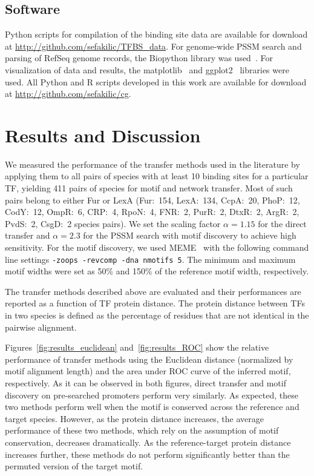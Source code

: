 \documentclass[]{llncs}
\begin{document}
\subsection{Software}
Python scripts for compilation of the binding site data are available for
download at \url{http://github.com/sefakilic/TFBS_data}. For genome-wide PSSM
search and parsing of RefSeq genome records, the Biopython library was
used~\cite{cock2009biopython}. For visualization of data and results, the
matplotlib~\cite{Hunter2007} and ggplot2~\cite{Wickham2009} libraries were
used. All Python and R scripts developed in this work are available for download
at \url{http://github.com/sefakilic/cg}.

\section{Results and Discussion}
We measured the performance of the transfer methods used in the literature by
applying them to all pairs of species with at least 10 binding sites for a
particular TF, yielding 411 pairs of species for motif and network
transfer. Most of such pairs belong to either Fur or LexA (Fur:~154, LexA:~134,
CcpA:~20, PhoP:~12, CodY:~12, OmpR:~6, CRP:~4, RpoN:~4, FNR:~2, PurR:~2,
DtxR:~2, ArgR:~2, PvdS:~2, CsgD:~2 species pairs). We set the scaling factor
$\alpha=1.15$ for the direct transfer and $\alpha=2.3$ for the PSSM search with
motif discovery to achieve high sensitivity. For the motif discovery, we used
MEME~\cite{bailey2006meme} with the following command line settings
\texttt{-zoops -revcomp -dna nmotifs 5}. The minimum and maximum motif widths
were set as 50\% and 150\% of the reference motif width, respectively.

The transfer methods described above are evaluated and their performances are
reported as a function of TF protein distance. The protein distance between TFs
in two species is defined as the percentage of residues that are not identical
in the pairwise alignment. 

Figures~\ref{fig:results_euclidean} and~\ref{fig:results_ROC} show the relative
performance of transfer methods using the Euclidean distance (normalized by
motif alignment length) and the area under ROC curve of the inferred motif,
respectively. As it can be observed in both figures, direct transfer and motif
discovery on pre-searched promoters perform very similarly. As expected, these
two methods perform well when the motif is conserved across the reference and
target species. However, as the protein distance increases, the average
performance of these two methods, which rely on the assumption of motif
conservation, decreases dramatically. As the reference-target protein distance
increases further, these methods do not perform significantly better than the
permuted version of the target motif.
\end{document}
